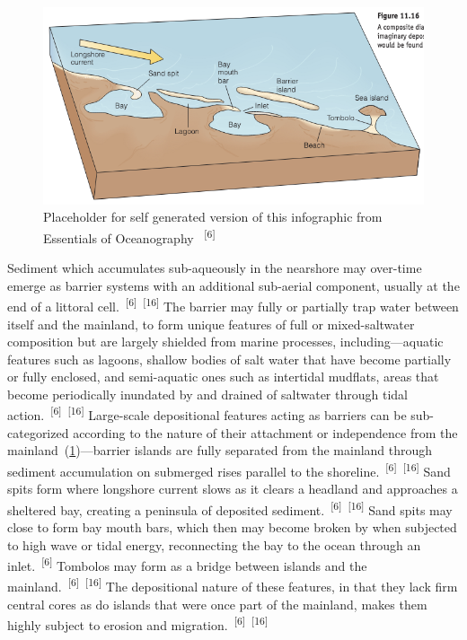 \documentclass{article}
\begin{document}
\begin{figure}
    \centering
    \includegraphics[width=.9\linewidth]{images/depositional-morphology.png}
    \caption{Placeholder for self generated version of this infographic from Essentials of Oceanography ~\textsuperscript{[6]}}
    \label{figure10}
\end{figure}

\par{Sediment which accumulates sub-aqueously in the nearshore may over-time emerge as barrier systems with an additional sub-aerial component, usually at the end of a littoral cell.~\textsuperscript{[6]}~\textsuperscript{[16]} The barrier may fully or partially trap water between itself and the mainland, to form unique features of full or mixed-saltwater composition but are largely shielded from marine processes, including---aquatic features such as lagoons, shallow bodies of salt water that have become partially or fully enclosed, and semi-aquatic ones such as intertidal mudflats, areas that become periodically inundated by and drained of saltwater through tidal action.~\textsuperscript{[6]}~\textsuperscript{[16]} Large-scale depositional features acting as barriers can be sub-categorized according to the nature of their attachment or independence from the mainland~(\cref{figure10})---barrier islands are fully separated from the mainland through sediment accumulation on submerged rises parallel to the shoreline.~\textsuperscript{[6]}~\textsuperscript{[16]} Sand spits form where longshore current slows as it clears a headland and approaches a sheltered bay, creating a peninsula of deposited sediment.~\textsuperscript{[6]}~\textsuperscript{[16]} Sand spits may close to form bay mouth bars, which then may become broken by when subjected to high wave or tidal energy, reconnecting the bay to the ocean through an inlet.~\textsuperscript{[6]} Tombolos may form as a bridge between islands and the mainland.~\textsuperscript{[6]}~\textsuperscript{[16]} The depositional nature of these features, in that they lack firm central cores as do islands that were once part of the mainland, makes them highly subject to erosion and migration.~\textsuperscript{[6]}~\textsuperscript{[16]}} 
\end{document}
